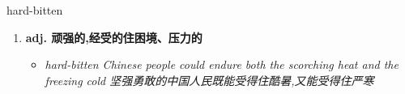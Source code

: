 
\begin{frame}
{\huge hard-bitten}
\begin{center}
\begin{enumerate}\Large
  \item \textbf{adj. 顽强的,经受的住困境、压力的}
  \begin{itemize}
    \item \em{\Large{hard-bitten Chinese people could endure both the scorching heat and the freezing cold 坚强勇敢的中国人民既能受得住酷暑,又能受得住严寒}}
  \end{itemize}
\end{enumerate}
\end{center}
\end{frame}
